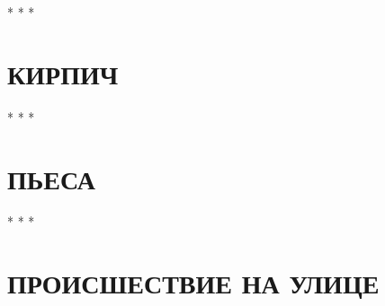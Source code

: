 \documentclass[a4paper,12pt,openany]{book}  %
\begin{document}
\begin{center}
* * *
\end{center}

\chapter{КИРПИЧ}

\vspace{0.3cm}

\begin{center}
* * *
\end{center}

\chapter{ПЬЕСА}

\vspace{0.3cm}

\begin{center}
* * *
\end{center}

\chapter{ПРОИСШЕСТВИЕ НА УЛИЦЕ}

\end{document}
